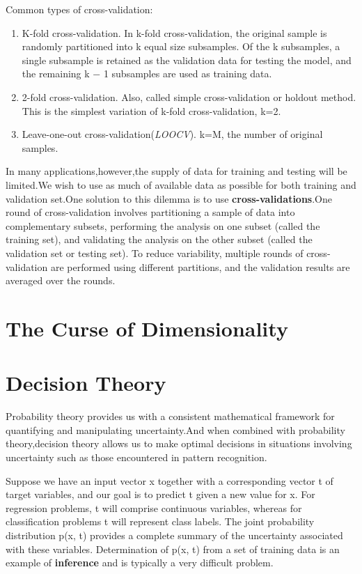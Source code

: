 Common types of cross-validation:
\begin{enumerate}
	\item K-fold cross-validation. In k-fold cross-validation, the original sample is randomly partitioned into k equal size subsamples. Of the k subsamples, a single subsample is retained as the validation data for testing the model, and the remaining k − 1 subsamples are used as training data.
	\item 2-fold cross-validation. Also, called simple cross-validation or holdout method. This is the simplest variation of k-fold cross-validation, k=2.
	\item Leave-one-out cross-validation(\emph{LOOCV}). k=M, the number of original samples.
\end{enumerate}
In many applications,however,the supply of data for training and testing will be limited.We wish to use as much of available data as possible for both training and validation set.One solution to this dilemma is to use \textbf{cross-validations}.One round of cross-validation involves partitioning a sample of data into complementary subsets, performing the analysis on one subset (called the training set), and validating the analysis on the other subset (called the validation set or testing set). To reduce variability, multiple rounds of cross-validation are performed using different partitions, and the validation results are averaged over the rounds.


\section{The Curse of Dimensionality}

\section{Decision Theory}
Probability theory provides us with a consistent mathematical framework for quantifying and manipulating uncertainty.And when combined with probability theory,decision theory allows us to make optimal decisions in situations involving uncertainty such as those encountered in pattern recognition.

Suppose we have an input vector x together with a corresponding vector t of target variables, and our goal is to predict t given a new value for x. For regression problems, t will comprise continuous variables, whereas for classification problems t will represent class labels. The joint probability distribution p(x, t) provides a complete summary of the uncertainty associated with these variables. Determination of p(x, t) from a set of training data is an example of \textbf{inference} and is typically a very difficult problem.

